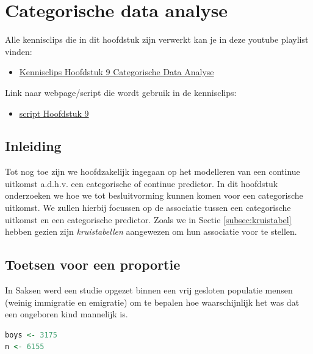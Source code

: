 \documentclass[
  12pt,dutch,coursenotes]{book}
\providecommand{\tightlist}{%
  \setlength{\itemsep}{0pt}\setlength{\parskip}{0pt}}
\begin{document}
\hypertarget{chap-categorisch}{%
\chapter{Categorische data analyse}\label{chap-categorisch}}

Alle kennisclips die in dit hoofdstuk zijn verwerkt kan je in deze youtube playlist vinden:

\begin{itemize}
\tightlist
\item
  \href{https://www.youtube.com/playlist?list=PLZH1hP8_LbJJnNyz6IMPqq6fCMZJ63y8x}{Kennisclips Hoofdstuk 9 Categorische Data Analyse}
\end{itemize}

Link naar webpage/script die wordt gebruik in de kennisclips:

\begin{itemize}
\tightlist
\item
  \href{https://statomics.github.io/sbc21/rmd/09-categoricalDataAnalysis.html}{script Hoofdstuk 9}
\end{itemize}

\hypertarget{inleiding-8}{%
\section{Inleiding}\label{inleiding-8}}

Tot nog toe zijn we hoofdzakelijk ingegaan op het modelleren van een continue uitkomst a.d.h.v. een categorische of continue predictor.
In dit hoofdstuk onderzoeken we hoe we tot besluitvorming kunnen komen voor een categorische uitkomst.
We zullen hierbij focussen op de associatie tussen een categorische uitkomst en een categorische predictor.
Zoals we in Sectie \ref{subsec:kruistabel} hebben gezien zijn \emph{kruistabellen} aangewezen om hun associatie voor te stellen.

\hypertarget{toetsen-voor-een-proportie}{%
\section{Toetsen voor een proportie}\label{toetsen-voor-een-proportie}}

In Saksen werd een studie opgezet binnen een vrij gesloten populatie mensen (weinig immigratie en emigratie) om te bepalen hoe waarschijnlijk het was dat een ongeboren kind mannelijk is.

\begin{lstlisting}[language=R]
boys <- 3175
n <- 6155
\end{lstlisting}
\end{document}
